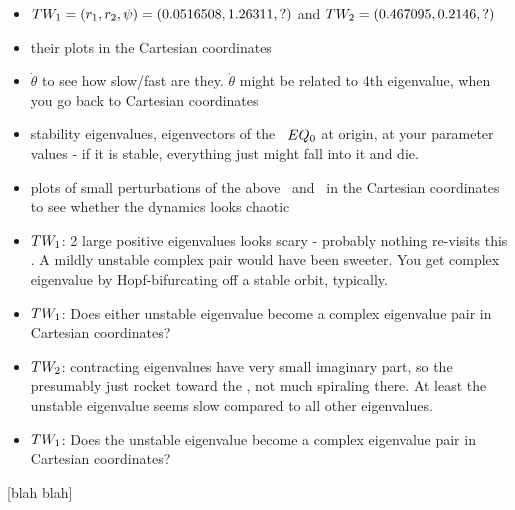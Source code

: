 \documentclass[aip,cha,
secnumarabic,
nofootinbib, tightenlines,
nobibnotes, showkeys, showpacs,
groupedaddress,
preprint,%
]{revtex4-1}
\begin{document}
\begin{itemize}
  \item $TW_{1} = (r_1,r_2,\psi)=(0.0516508, 1.26311,?)$ and
        $TW_{2} = (0.467095,0.2146,?)$
  \item their plots in the Cartesian coordinates
  \item $\dot{\theta}$ to see how slow/fast are they. $\dot{\theta}$
        might be related to 4th eigenvalue, when you go back
        to Cartesian coordinates
  \item stability eigenvalues, eigenvectors of the \eqv\ $EQ_{0}$ at
        origin, at your parameter values - if it is stable, everything
        just might fall into it and die.
  \item plots of small perturbations of the above \eqv\ and \reqva\ in
        the Cartesian coordinates to see whether the dynamics looks
        chaotic
  \item $TW_{1}$: 2 large positive eigenvalues looks scary - probably
        nothing re-visits this \reqv. A mildly unstable complex pair
        would have been sweeter. You get complex eigenvalue by Hopf-bifurcating off a
        stable orbit, typically.
  \item $TW_{1}$: Does either unstable eigenvalue become a complex
        eigenvalue pair in Cartesian coordinates?
  \item $TW_{2}$: contracting eigenvalues have very small imaginary
        part, so the presumably just rocket toward the \reqv, not much
        spiraling there. At least the unstable eigenvalue seems slow
        compared to all other eigenvalues.
  \item $TW_{1}$: Does the unstable eigenvalue become a complex
        eigenvalue pair in Cartesian coordinates?
\end{itemize}

 [blah blah]
\end{document}
